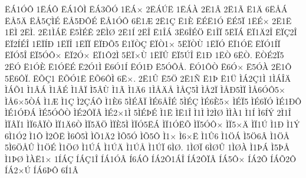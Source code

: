 {^^cb^^c11^^d3^^d4
1^^cb^^c1^^d4
^^cb^^c11^^d4^^cc
^^cb^^c13^^d5^^d3
1^^cb^^c1^^d7
2^^cb^^c1^^da^^cb
1^^cb^^c1^^c0
2^^cb1^^c2
2^^cb1^^c3
^^cb1^^c4
6^^cb^^c5^^c1
^^cb^^c55^^c4
^^cb^^c55^^c7^^cc^^c9
^^cb^^c55^^d0^^d4^^c9
^^cb^^c51^^d3^^d4
6^^cb1^^c6
2^^cb1^^c7
^^cb1^^c8
^^cb^^c9^^cb1^^d3
^^cb^^c95^^cf
1^^cb^^c9^^d7
2^^cb1^^cb
1^^cb^^cc
2^^cb^^cc.
2^^cb1^^cc^^c1^^cb
^^cb5^^cc^^c9^^ca
2^^cb^^cc^^d8
2^^cb1^^cd
2^^cb^^ce
^^cb1^^ce^^c1
3^^cb6^^ce^^c9^^d6
^^cb1^^ce^^cf
5^^cb^^cf^^c1
^^cb^^cf1^^c42^^ce
^^cb^^cf^^c72^^ce
^^cb^^cf2^^cd^^c9^^ce
1^^cb^^cf^^cd^^d0
1^^cb^^cf^^ce
1^^cb^^cf^^cf
^^cb^^cf^^d0^^d55
^^cb1^^cf^^d2^^c7
^^cb^^cf^^d21^^d7
5^^cb^^cf^^d2^^d9
1^^cb^^cf^^d3
^^cb^^cf1^^d3^^cb
^^cb^^cf^^d31^^cd^^cf
^^cb^^cf^^d35^^ce
^^cb^^cf5^^d3^^d4^^d7
^^cb^^cf2^^d3^^d7
^^cb^^cf1^^d42^^cc
5^^cb^^cf^^d7^^d9
1^^cb^^cf^^db
^^cb^^cf5^^da^^ce
^^cb1^^d0
1^^cb^^d2
6^^cb^^d2.
^^cb^^d2^^c92^^cf5
2^^cb^^d3
^^cb1^^d3^^c8
^^cb1^^d3^^cb^^c9
^^cb2^^d31^^cc
^^cb6^^d31^^cd
^^cb^^d31^^d0
^^cb5^^d3^^d4^^c5.
^^cb^^d31^^d4^^d2
^^cb6^^d3^^d7
^^cb5^^d3^^c0
2^^cb1^^d4
5^^cb6^^d4^^cf.
^^cb^^d5^^c71
^^cb^^d5^^d31^^cb
^^cb^^d56^^d4^^cc
6^^cb^^d7.
2^^cb1^^db
^^cb5^^d6
2^^cb1^^d1
^^cb1^^de
^^cb1^^dc
^^cc^^c12^^c71^^cc
1^^cc^^c1^^ce^^c4
^^cc^^c1^^d51
^^cc1^^c2^^c1
^^cc1^^c2^^c9
^^cc1^^c2^^cf
^^cc5^^c2^^d9
^^cc1^^c3
^^cc1^^c46
1^^cc^^c5^^c4^^c5
^^cc^^c5^^c75^^cc
^^cc^^c52^^cf
^^cc^^c5^^d05^^cc^^cf
^^cc^^c56^^d3^^d45^^d7
^^cc^^c56^^d75^^d2^^c1
^^cc1^^c6
^^cc1^^c7
^^cc2^^c7^^c1^^d4
^^cc1^^c86
5^^cc^^c9^^c3^^cf
^^cc^^c96^^c5^^ce^^c9
5^^cc^^c9^^c7
^^cc^^c96^^c85^^d7
^^cc^^c9^^cf5
^^cc^^c96^^cf^^d3
^^cc^^c91^^d0^^d4
^^cc^^c91^^d3^^d0^^c1
^^cc^^c95^^d3^^d4^^d2
^^cc^^c92^^d4^^cf^^c2
^^cc^^c92^^d71^^cc
5^^cc^^c9^^de^^c9
^^cc1^^cb
^^cc^^cb1^^ce
^^cc1^^cc
^^cc2^^cc^^d8
^^cc^^cc^^c01
^^cc1^^cd
^^cc6^^cd^^dd
2^^cc1^^ce
^^cc^^cf^^c2^^cf1
^^cc^^cf6^^c2^^cf^^d2
^^cc^^cf1^^c46^^d2
^^cc^^cf5^^c4^^d6
^^cc^^cf^^c85^^cc
^^cc^^cf^^d35^^cb^^c1
^^cc^^cf1^^d3^^cb^^d5
^^cc^^cf5^^d3^^d4^^d7
^^cc^^cf5^^d7^^c4
^^cc^^cf1^^da
^^cc1^^d0
^^cc1^^dd
6^^cc1^^d32
^^cc1^^d4
^^cc2^^d4^^cb
^^cc6^^d45^^cc
^^cc^^d51^^c42
^^cc^^d55^^d3
^^cc^^d55^^d4
^^cc1^^d7
^^cc6^^d7^^cb
^^cc1^^db6
^^cc1^^d6^^c1
^^cc5^^d66^^c2
^^cc1^^d6^^c5
5^^cc6^^d6^^c5^^db
^^cc1^^d6^^c9
^^cc1^^d6^^d8
^^cc1^^da^^c1
^^cc1^^da^^c4
^^cc1^^da^^c5
^^cc1^^da^^cf
6^^cc^^d8.
1^^cc^^d8^^cf
6^^cc^^d8^^db
1^^cc^^d8^^c0
^^cc1^^de^^c1
^^cc5^^de^^c5
^^cc1^^de^^d8
^^cc^^c0^^cb1^^d7
1^^cd^^c1^^c7
^^cd^^c1^^c71^^ce
^^cd^^c11^^d3^^c2
^^cd6^^c1^^d4
^^cd^^c12^^d41^^c1^^ce
^^cd^^c12^^d4^^cf^^c2
^^cd^^c15^^d4^^d7
^^cd^^c12^^d5
^^cd^^c1^^d52^^d4
^^cd^^c12^^d7^^da
^^cd^^c16^^de^^d4
6^^cd1^^c2
}
